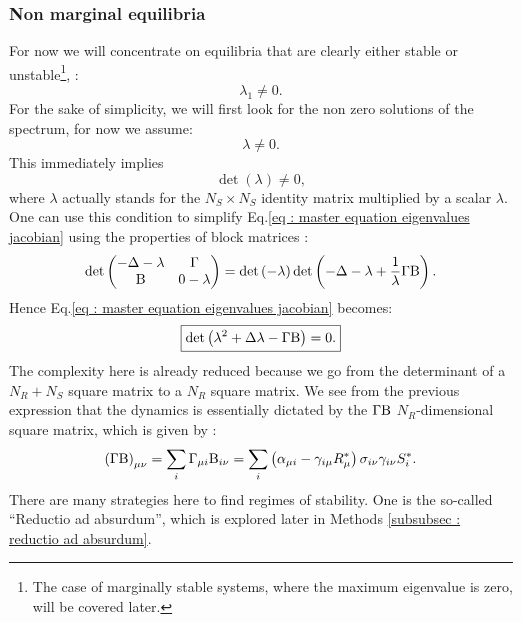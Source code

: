 \documentclass[12pt, titlepage]{report}
\begin{document}
\subsubsection{Non marginal equilibria}\label{section : non marginal equilibria}
For now we will concentrate on equilibria that are clearly either stable or unstable\footnote{The case of marginally stable systems, where the maximum eigenvalue is zero, will be covered later.}, \ie:
\begin{equation}
\lambda_1 \neq 0.
\end{equation}
For the sake of simplicity, we will first look for the non zero solutions of the spectrum, \ie for now we assume:
\begin{equation}
\lambda \neq 0.
\end{equation}
This immediately implies
\begin{equation}
\det\left(\lambda\right)\neq 0,
\end{equation}
where $\lambda$ actually stands for the $N_S \times N_S$ identity matrix multiplied by a scalar $\lambda$. One can use this condition to simplify Eq.\eqref{eq : master equation eigenvalues jacobian} using the properties of block matrices \cite{powell_calculating_2011} :
\begin{equation}
\det
\begin{pmatrix}
  -\Delta - \lambda  & \Gamma \\
  \text{B} & 0-\lambda
\end{pmatrix} =
\det\left(-\lambda\right)\det\left(-\Delta- \lambda+\frac{1}{\lambda}\Gamma \text{B}\right).
\end{equation}
Hence Eq.\eqref{eq : master equation eigenvalues jacobian} becomes:
\begin{equation}
\boxed{
\det\left(\lambda^2+\Delta \lambda-\Gamma \text{B}\right)=0. \label{eq : master equation non marginal}
}
\end{equation}
The complexity here is already reduced because we go from the determinant of a $N_R+N_S$ square matrix to a $N_R$ square matrix. We see from the previous expression that the dynamics is essentially dictated by the $\Gamma \text{B}$ $N_R$-dimensional square matrix, which is given by :
\begin{equation}
\left(\Gamma \text{B}\right)_{\mu \nu} = \sum_i \Gamma_{\mu i} \text{B}_{i \nu} = \sum_i \left(\alpha_{\mu i}-\gamma_{i \mu} R^*_\mu \right)\sigma_{i\nu}\gamma_{i\nu}S^*_i.
\end{equation}
There are many strategies here to find regimes of stability. One is the so-called ``Reductio ad absurdum'', which is explored later in Methods \ref{subsubsec : reductio ad absurdum}.
\end{document}
